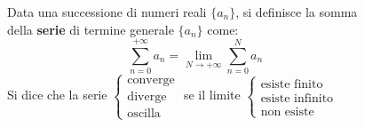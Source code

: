 \documentclass[a4paper]{article}
\theoremstyle{break}
\theoremstyle{break}
\theoremstyle{break}
\theoremstyle{break}
\begin{document}
\begin{figure}[H]
  \begin{definition}
    Data una successione di numeri reali \( \{a_n\}  \), si definisce la somma della \textbf{serie}
    di termine generale \( \{a_n\}  \) come:
    \[
      \sum_{n=0}^{+\infty} a_n = \lim_{N \to +\infty} \sum_{n=0}^{N} a_n
    \] 
    Si dice che la serie \( \begin{cases}
      \text{converge}\\
      \text{diverge}\\
      \text{oscilla}
      \end{cases} \) se il limite \( \begin{cases}
      \text{esiste finito}\\
      \text{esiste infinito}\\
      \text{non esiste}
    \end{cases} \) 
  \end{definition}
\end{figure}
\end{document}
